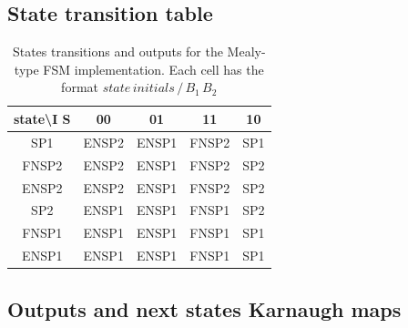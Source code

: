 \documentclass[../../e3_tp3_main.tex]{subfiles}
\begin{document}
\subsection{State transition table}
\begin{table}[H]	%
	\centering
		\begin{tabular}{|c|c|c|c|c|}
		\hline 
		state\textbackslash I S & 00 & 01 & 11 & 10 \\ 
		\hline 
		SP1 & ENSP2 & ENSP1 & FNSP2 & SP1 \\ 
		\hline 
		FNSP2 & ENSP2 & ENSP1 & FNSP2 & SP2 \\ 
		\hline 
		ENSP2 & ENSP2 & ENSP1 & FNSP2 & SP2 \\ 
		\hline 
		SP2 & ENSP1 & ENSP1 & FNSP1 & SP2 \\ 
		\hline 
		FNSP1 & ENSP1 & ENSP1 & FNSP1 & SP1 \\ 
		\hline 
		ENSP1 & ENSP1 & ENSP1 & FNSP1 & SP1 \\ 
		\hline 
		\end{tabular} 
	\caption[States transitions and outputs for the Mealy-type FSM implementation]{States transitions and outputs for the Mealy-type FSM implementation. Each cell has the format $state\, initials \,/\, B_1\, B_2$}
	\label{tab:ej1_moore_transitions}
\end{table}

\subsection{Outputs and next states Karnaugh maps}
\end{document}
